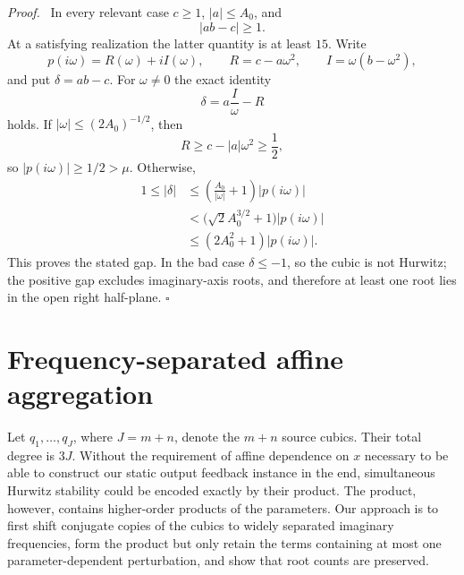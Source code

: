 \documentclass[final,5p,times,twocolumn]{elsarticle}
\newenvironment{proof}[1][Proof]
  {\par\smallskip\noindent\textit{#1.}\ }
  {\hfill$\square$\par\smallskip}
\begin{document}
\begin{proof}
In every relevant case $c\ge1$, $|a|\le A_0$, and
\[
|ab-c|\ge1.
\]
At a satisfying realization the latter quantity is at least $15$. Write
\[
p(i\omega)=R(\omega)+iI(\omega),\qquad
R=c-a\omega^2,\qquad I=\omega(b-\omega^2),
\]
and put $\delta=ab-c$. For $\omega\ne0$ the exact identity
\begin{equation}\label{eq:cubic-imag-identity}
\delta=a\frac{I}{\omega}-R
\end{equation}
holds. If $|\omega|\le(2A_0)^{-1/2}$, then
\[
R\ge c-|a|\omega^2\ge\frac12,
\]
so $|p(i\omega)|\ge1/2>\mu$. Otherwise,
\[
\begin{aligned}
1\le|\delta|
&\le\left(\frac{A_0}{|\omega|}+1\right)|p(i\omega)|\\
&<\bigl(\sqrt2 A_0^{3/2}+1\bigr)|p(i\omega)|\\
&\le(2A_0^2+1)|p(i\omega)|.
\end{aligned}
\]
This proves the stated gap. In the bad case $\delta\le-1$, so the cubic is not Hurwitz; the positive gap excludes imaginary-axis roots, and therefore at least one root lies in the open right half-plane.
\end{proof}

\section{Frequency-separated affine aggregation}\label{sec:aggregation}

Let $q_1,\ldots,q_J$, where $J=m+n$, denote the $m+n$ source cubics. Their total degree is $3J$. Without the requirement of affine dependence on $x$ necessary to be able to construct our static output feedback instance in the end, simultaneous Hurwitz stability could be encoded exactly by their product. The product, however, contains higher-order products of the parameters. Our approach is to first shift conjugate copies of the cubics to widely separated imaginary frequencies, form the product but only retain the terms containing at most one parameter-dependent perturbation, and show that root counts are preserved.
\end{document}
